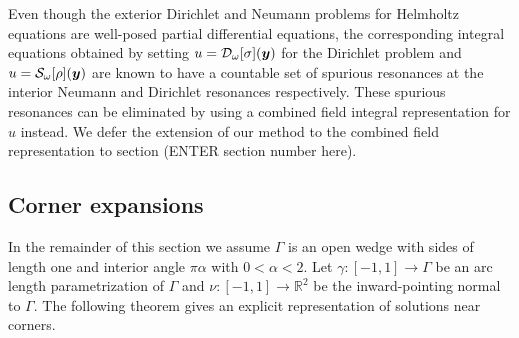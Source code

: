 \begin{remark}
Even though the exterior Dirichlet and Neumann problems for Helmholtz equations are well-posed partial differential equations, the corresponding integral equations obtained by setting $u = \mathcal{D}_{\omega}[\sigma](\boldsymbol{y})$ for the Dirichlet problem and
$u = \mathcal{S}_{\omega}[\rho](\boldsymbol{y})$ are known to have a countable set of spurious resonances at the interior Neumann and Dirichlet resonances respectively. These spurious resonances can be eliminated by using a combined field integral representation 
for $u$ instead. We defer the extension of our method to the combined field representation to section (ENTER section number here).
\end{remark}

\subsection{Corner expansions}

In the remainder of this section we assume $\Gamma$ is an open wedge with sides of length one and interior angle $\pi \alpha$ with $0 <\alpha<2.$ Let $\gamma:[-1,1] \rightarrow \Gamma$ be an arc length parametrization of $\Gamma$ and $\nu:[-1,1] \rightarrow \mathbb{R}^2$ be the inward-pointing normal to $\Gamma.$ 
The following theorem  gives an explicit representation of solutions near corners.


